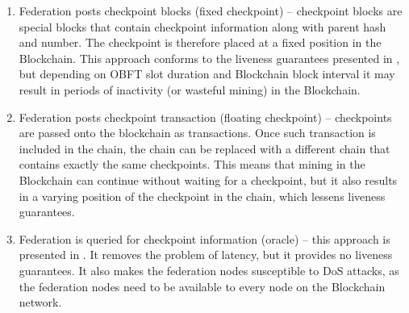 \begin{enumerate}
  \item Federation posts checkpoint blocks (fixed checkpoint) -- checkpoint blocks are special blocks that contain checkpoint information along with parent hash and number. The checkpoint is therefore placed at a fixed position in the Blockchain. This approach conforms to the liveness guarantees presented in \cite{chkp-paper}, but depending on OBFT slot duration and Blockchain block interval it may result in periods of inactivity (or wasteful mining) in the Blockchain.
  \item Federation posts checkpoint transaction (floating checkpoint) -- checkpoints are passed onto the blockchain as transactions. Once such transaction is included in the chain, the chain can be replaced with a different chain that contains exactly the same checkpoints. This means that mining in the Blockchain can continue without waiting for a checkpoint, but it also results in a varying position of the checkpoint in the chain, which lessens liveness guarantees.
  \item Federation is queried for checkpoint information (oracle) -- this approach is presented in \cite{obft-paper}. It removes the problem of latency, but it provides no liveness guarantees. It also makes the federation nodes susceptible to DoS attacks, as the federation nodes need to be available to every node on the Blockchain network.
\end{enumerate}




